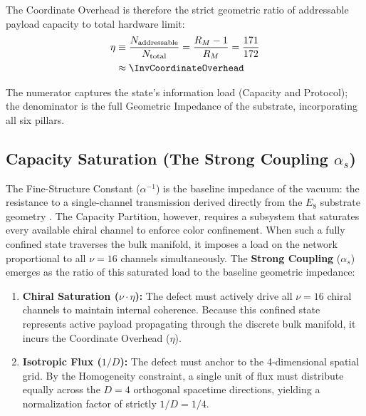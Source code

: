 The Coordinate Overhead is therefore the strict geometric ratio of addressable payload capacity to total hardware limit:
\begin{equation}
\label{eq:coordinate_overhead}
\begin{split}
    \eta &\equiv \frac{N_{\text{addressable}}}{N_{\text{total}}} = \frac{R_M - 1}{R_M} = \frac{171}{172} \\
         &\approx \InvCoordinateOverhead
\end{split}
\end{equation}

The numerator captures the state's information load (Capacity and Protocol); the denominator is the full Geometric Impedance of the substrate, incorporating all six pillars.

\subsection{Capacity Saturation (The Strong Coupling \texorpdfstring{$\alpha_s$}{alpha\_s})}
\label{subsec:saturation_ratio}

The Fine-Structure Constant ($\alpha^{-1}$) is the baseline impedance of the vacuum: the resistance to a single-channel transmission derived directly from the $E_8$ substrate geometry \cite{meyer_informational_2026}. The Capacity Partition, however, requires a subsystem that saturates every available chiral channel to enforce color confinement. When such a fully confined state traverses the bulk manifold, it imposes a load on the network proportional to all $\nu=16$ channels simultaneously. The \textbf{Strong Coupling} ($\alpha_s$) emerges as the ratio of this saturated load to the baseline geometric impedance:

\begin{enumerate}
    \item \textbf{Chiral Saturation ($\nu \cdot \eta$):} The defect must actively drive all $\nu=16$ chiral channels to maintain internal coherence. Because this confined state represents active payload propagating through the discrete bulk manifold, it incurs the Coordinate Overhead ($\eta$).
    \item \textbf{Isotropic Flux ($1/D$):} The defect must anchor to the 4-dimensional spatial grid. By the Homogeneity constraint, a single unit of flux must distribute equally across the $D=4$ orthogonal spacetime directions, yielding a normalization factor of strictly $1/D = 1/4$.
\end{enumerate}

